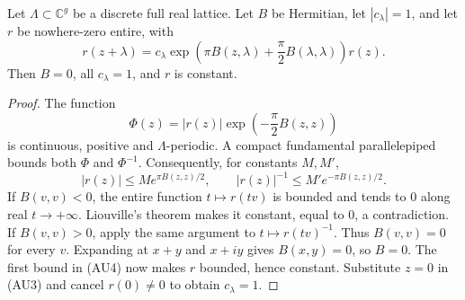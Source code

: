 \begin{srlemma}
\label{lem:ftb-trivial-appell-humbert-data}
Let \(\Lambda\subset\mathbb C^g\) be a discrete full real lattice.
Let \(B\) be Hermitian, let \(|c_\lambda|=1\), and let \(r\)
be nowhere-zero entire, with
\[
 r(z+\lambda)=c_\lambda
       \exp\!\left(\pi B(z,\lambda)+\frac{\pi}{2}B(\lambda,\lambda)\right)r(z).
                                                               \tag{AU3}
\]
Then \(B=0\), all \(c_\lambda=1\), and \(r\) is constant.
\end{srlemma}
\begin{proof}
The function
\[
       \Phi(z)=|r(z)|\exp\!\left(-\frac{\pi}{2}B(z,z)\right)
\]
is continuous, positive and \(\Lambda\)-periodic.
A compact fundamental parallelepiped bounds both \(\Phi\)
and \(\Phi^{-1}\).
Consequently, for constants \(M,M'\),
\[
 |r(z)|\le M e^{\pi B(z,z)/2},\qquad
 |r(z)|^{-1}\le M'e^{-\pi B(z,z)/2}.                         \tag{AU4}
\]
If \(B(v,v)<0\), the entire function \(t\mapsto r(tv)\)
is bounded and tends to \(0\) along real \(t\to+\infty\).
Liouville's theorem makes it constant, equal to \(0\), a contradiction.
If \(B(v,v)>0\), apply the same argument to \(t\mapsto r(tv)^{-1}\).
Thus \(B(v,v)=0\) for every \(v\).
Expanding at \(x+y\) and \(x+iy\) gives \(B(x,y)=0\), so \(B=0\).
The first bound in (AU4) now makes \(r\) bounded, hence constant.
Substitute \(z=0\) in (AU3) and cancel \(r(0)\ne0\)
to obtain \(c_\lambda=1\).
\end{proof}

